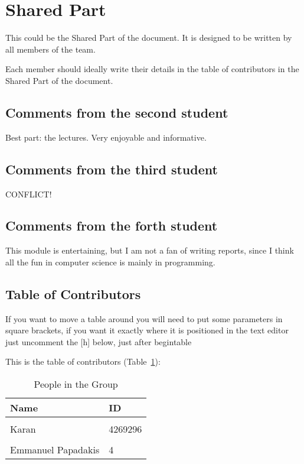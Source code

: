 \section{Shared Part}

This could be the Shared Part of the document. It is designed to be written by all members of the team.

Each member should ideally write their details in the table of contributors in the Shared Part of the document.



\subsection{Comments from the second student}
Best part: the lectures. Very enjoyable and informative. 
\subsection{Comments from the third student}
CONFLICT!

\subsection{Comments from the forth student}
This module is entertaining, but I am not a fan of writing reports, since I think all the fun in computer science is mainly in programming.

\subsection{Table of Contributors}


If you want to move a table around you will need to put some parameters in square brackets, if you want it exactly where it is positioned in the text editor just uncomment the [h] below, just after begin{table}

This is the table of contributors (Table~\ref{authors}):
\begin{table}%
\centering
\caption{People in the Group}
\label{authors}
\begin{tabular}{|l|l|}
\hline
\textbf{Name} & \textbf{ID} \\
\hline
& \\
\hline
Karan&4269296 \\
\hline
& \\
\hline
Emmanuel Papadakis & 4 \\
\hline
\end{tabular}
\end{table}